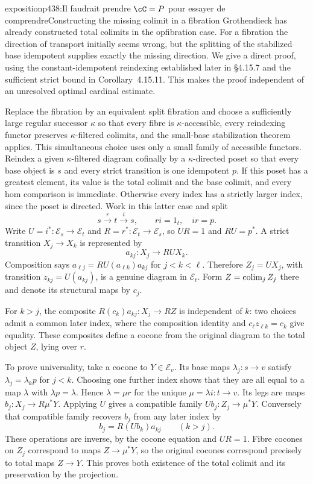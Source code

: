 \begin{dcomment}{exposition}{p438:Il faudrait prendre $\cC = P$ pour essayer de comprendre}{Constructing the missing colimit in a fibration}
Grothendieck has already constructed total colimits in the opfibration case. For a fibration the direction of transport initially seems wrong, but the splitting of the stabilized base idempotent supplies exactly the missing direction. We give a direct proof, using the constant-idempotent reindexing established later in \S4.15.7 and the sufficient strict bound in Corollary~4.15.11. This makes the proof independent of an unresolved optimal cardinal estimate.

Replace the fibration by an equivalent split fibration and choose a sufficiently large regular successor $\kappa$ so that every fibre is $\kappa$-accessible, every reindexing functor preserves $\kappa$-filtered colimits, and the small-base stabilization theorem applies. This simultaneous choice uses only a small family of accessible functors. Reindex a given $\kappa$-filtered diagram cofinally by a $\kappa$-directed poset so that every base object is $s$ and every strict transition is one idempotent $p$. If this poset has a greatest element, its value is the total colimit and the base colimit, and every hom comparison is immediate. Otherwise every index has a strictly larger index, since the poset is directed. Work in this latter case and split
\[
 s\xrightarrow{r}t\xrightarrow{i}s,
 \qquad ri=1_t,\quad ir=p.
\]
Write $U=i^*:\mathcal E_s\to\mathcal E_t$ and $R=r^*:\mathcal E_t\to\mathcal E_s$, so $UR=1$ and $RU=p^*$. A strict transition $X_j\to X_k$ is represented by
\[
 a_{kj}:X_j\longrightarrow RU X_k.
\]
Composition says $a_{\ell j}=RU(a_{\ell k})a_{kj}$ for $j<k<\ell$. Therefore $Z_j=UX_j$, with transition $z_{kj}=U(a_{kj})$, is a genuine diagram in $\mathcal E_t$. Form $Z=\mathop{\rm colim}_j Z_j$ there and denote its structural maps by $c_j$.

For $k>j$, the composite $R(c_k)a_{kj}:X_j\to RZ$ is independent of $k$: two choices admit a common later index, where the composition identity and $c_\ell z_{\ell k}=c_k$ give equality. These composites define a cocone from the original diagram to the total object $Z$, lying over $r$.

To prove universality, take a cocone to $Y\in\mathcal E_v$. Its base maps $\lambda_j:s\to v$ satisfy $\lambda_j=\lambda_kp$ for $j<k$. Choosing one further index shows that they are all equal to a map $\lambda$ with $\lambda p=\lambda$. Hence $\lambda=\mu r$ for the unique $\mu=\lambda i:t\to v$. Its legs are maps $b_j:X_j\to R\mu^*Y$. Applying $U$ gives a compatible family $Ub_j:Z_j\to\mu^*Y$. Conversely that compatible family recovers $b_j$ from any later index by
\[
 b_j=R(Ub_k)a_{kj}\qquad(k>j).
\]
These operations are inverse, by the cocone equation and $UR=1$. Fibre cocones on $Z_j$ correspond to maps $Z\to\mu^*Y$, so the original cocones correspond precisely to total maps $Z\to Y$. This proves both existence of the total colimit and its preservation by the projection.


\end{dcomment}
